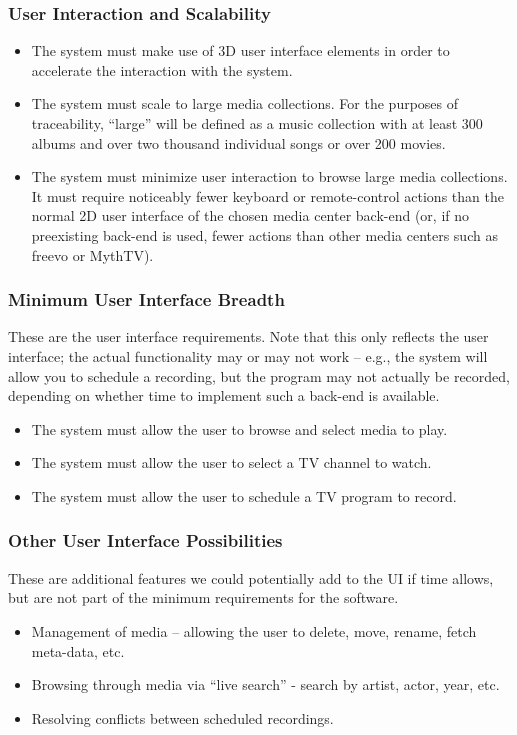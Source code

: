 \documentclass[letterpaper, titlepage, 11pt]{article}
\begin{document}
\subsubsection{User Interaction and Scalability}
\begin{itemize}
\item The system must make use of 3D user interface elements in order to accelerate the
      interaction with the system.
\item The system must scale to large media collections.  For the purposes of traceability,
      ``large'' will be defined as a music collection with at least 300 albums and over
      two thousand individual songs or over 200 movies.
\item The system must minimize user interaction to browse large media
	collections.  It must require noticeably fewer keyboard or
	remote-control actions than the normal 2D user interface of the chosen
	media center back-end (or, if no preexisting back-end is used, fewer
	actions than other media centers such as freevo or MythTV).
\end{itemize}

\subsubsection{Minimum User Interface Breadth}
These are the user interface requirements.  Note that this only reflects the user interface;
the actual functionality may or may not work -- e.g., the system will allow you to schedule a
recording, but the program may not actually be recorded, depending on whether time to implement
such a back-end is available.
\begin{itemize}
\item The system must allow the user to browse and select media to play.
\item The system must allow the user to select a TV channel to watch.
\item The system must allow the user to schedule a TV program to record.
\end{itemize}

\subsubsection{Other User Interface Possibilities}
These are additional features we could potentially add to the UI if time allows, but are
not part of the minimum requirements for the software.
\begin{itemize}
\item Management of media -- allowing the user to delete, move, rename, fetch meta-data, etc.
\item Browsing through media via ``live search'' - search by artist, actor, year, etc.
\item Resolving conflicts between scheduled recordings.
\end{itemize}
\end{document}
